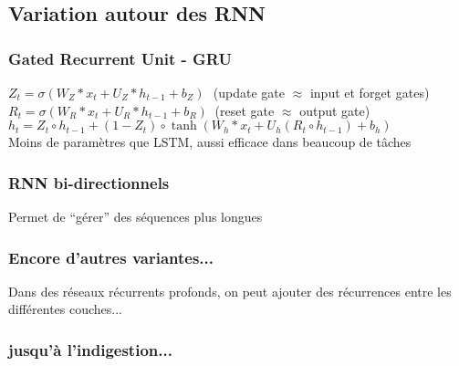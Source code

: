 \subsection{Variation autour des RNN}

\begin{frame}
  \frametitle{Gated Recurrent Unit - GRU}
  $Z_{t}=\sigma (W_{Z}*x_{t}+U_{Z}*h_{t-1}+b_{Z})\,\,\,\,$(update gate $\approx$ input et forget gates) \\
  $R_{t}=\sigma (W_{R}*x_{t}+U_{R}*h_{t-1}+b_{R})\;\;$(reset gate $\approx$ output gate) \\
  $h_{t}=Z_{t}\circ h_{t-1}+(1-Z_{t})\circ \tanh(W_{h}*x_{t}+U_{h}(R_{t}\circ h_{t-1})+b_{h})$ \\
  Moins de paramètres que LSTM, aussi efficace dans beaucoup de tâches
\end{frame}

\begin{frame}
  \frametitle{RNN bi-directionnels}
  Permet de ``gérer'' des séquences plus longues
\end{frame}

\begin{frame}
  \frametitle{Encore d'autres variantes...}
  Dans des réseaux récurrents profonds, on peut ajouter des récurrences entre les différentes couches... \\
\end{frame}

\begin{frame}
  \frametitle{jusqu'à l'indigestion...}
\end{frame}
